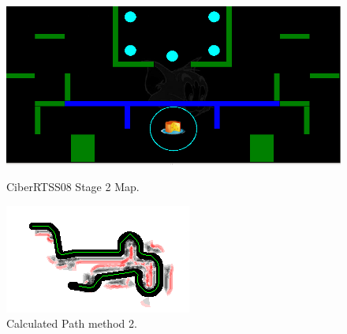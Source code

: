 \documentclass[oribibl]{llncs}
\begin{document}
\begin{figure}[ht]
\begin{minipage}[b]{0.45\linewidth}
\centering
\includegraphics[width=\textwidth]{map.png}
\caption{CiberRTSS08 Stage 2 Map.}
\label{fig:map}
\end{minipage}
\hspace{0.5cm}
\begin{minipage}[b]{0.45\linewidth}
\centering
\includegraphics[width=\textwidth]{pathAStar.png}
\caption{Calculated Path method 2.}
\label{fig:pathAStar}
\end{minipage}
\end{figure}
\end{document}
